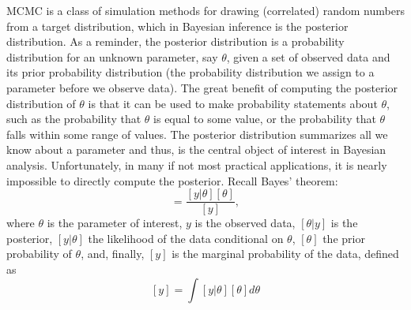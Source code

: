 MCMC is a class of simulation methods for
drawing (correlated) random numbers from a target distribution, which
in Bayesian inference is the posterior distribution.
As a reminder, the posterior distribution is a probability
distribution for an unknown parameter, say $\theta$, given a set of
observed data and its prior probability distribution (the probability
distribution we assign to a parameter before we observe data).  The
great benefit of computing the posterior distribution of $\theta$ is
that it can be used to make probability statements about $\theta$,
such as the probability that $\theta$ is equal to some value, or the
probability that $\theta$ falls within some range of values. 
The posterior distribution summarizes all we know about a parameter
and thus, is the central object of interest in Bayesian
analysis. Unfortunately, in many if not most practical applications,
it is nearly impossible to directly compute the posterior. Recall
Bayes' theorem:
\begin{equation}
[\theta|y] = \frac{[y|\theta] [\theta]}  {[y]},
\label{mcmc.eq.bayes}
\end{equation}
where $\theta$ is the parameter of interest, $y$ is the observed data,
$[\theta|y]$ is the posterior, $[y|\theta]$ the likelihood of the
data conditional on $\theta$, $[\theta]$ the prior probability of
$\theta$, and, finally, $[y]$ is the marginal probability of the
data, defined as 
\[
[y] = \int [y|\theta]  [\theta] d\theta
\]

